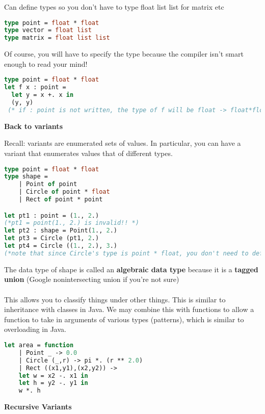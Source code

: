 \documentclass[12pt,a4paper]{article} %
\begin{document}
Can define types so you don't have to type float list list for matrix etc
\begin{lstlisting}[language=Caml]
type point = float * float
type vector = float list
type matrix = float list list
\end{lstlisting}
Of course, you will have to specify the type because the compiler isn't smart enough to read your mind!
\begin{lstlisting}[language=Caml]
type point = float * float
let f x : point =
  let y = x +. x in
  (y, y)
 (* if : point is not written, the type of f will be float -> float*float instead of float -> point!*)
\end{lstlisting}
\textbf{Back to variants}

Recall: variants are enumerated sets of values. In particular, you can have a variant that enumerates values that of different types.
\begin{lstlisting}[language=Caml]
type point = float * float
type shape =
	| Point of point
	| Circle of point * float
	| Rect of point * point

let pt1 : point = (1., 2.)
(*pt1 = point(1., 2.) is invalid!! *)
let pt2 : shape = Point(1., 2.)
let pt3 = Circle (pt1, 2.)
let pt4 = Circle ((1., 2.), 3.)
(*note that since Circle's type is point * float, you don't need to define the tuple as a point since it is already defined!*)
\end{lstlisting}
The data type of shape is called an \textbf{algebraic data type} because it is a \textbf{tagged union} (Google nonintersecting union if you're not sure)
\\\\
This allows you to classify things under other things. This is similar to inheritance with classes in Java. We may combine this with functions to allow a function to take in arguments of various types (patterns), which is similar to overloading in Java.
\begin{lstlisting}[language=Caml]
let area = function
	| Point _ -> 0.0
	| Circle (_,r) -> pi *. (r ** 2.0)
	| Rect ((x1,y1),(x2,y2)) ->
	let w = x2 -. x1 in
	let h = y2 -. y1 in
	w *. h
\end{lstlisting}
\textbf{Recursive Variants}
\end{document}
